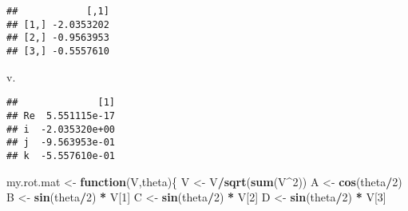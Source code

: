 \documentclass[]{article}
\newenvironment{Shaded}{\begin{snugshade}}{\end{snugshade}}
\newcommand{\KeywordTok}[1]{\textcolor[rgb]{0.13,0.29,0.53}{\textbf{#1}}}
\newcommand{\DecValTok}[1]{\textcolor[rgb]{0.00,0.00,0.81}{#1}}
\newcommand{\StringTok}[1]{\textcolor[rgb]{0.31,0.60,0.02}{#1}}
\newcommand{\ControlFlowTok}[1]{\textcolor[rgb]{0.13,0.29,0.53}{\textbf{#1}}}
\newcommand{\OperatorTok}[1]{\textcolor[rgb]{0.81,0.36,0.00}{\textbf{#1}}}
\newcommand{\NormalTok}[1]{#1}
\begin{document}
\begin{verbatim}
##            [,1]
## [1,] -2.0353202
## [2,] -0.9563953
## [3,] -0.5557610
\end{verbatim}

\begin{Shaded}
\begin{Highlighting}[]
\NormalTok{v.}
\end{Highlighting}
\end{Shaded}

\begin{verbatim}
##              [1]
## Re  5.551115e-17
## i  -2.035320e+00
## j  -9.563953e-01
## k  -5.557610e-01
\end{verbatim}

\begin{Shaded}
\begin{Highlighting}[]
\NormalTok{my.rot.mat <-}\StringTok{ }\ControlFlowTok{function}\NormalTok{(V,theta)\{}
\NormalTok{  V <-}\StringTok{ }\NormalTok{V}\OperatorTok{/}\KeywordTok{sqrt}\NormalTok{(}\KeywordTok{sum}\NormalTok{(V}\OperatorTok{^}\DecValTok{2}\NormalTok{))}
\NormalTok{  A <-}\StringTok{ }\KeywordTok{cos}\NormalTok{(theta}\OperatorTok{/}\DecValTok{2}\NormalTok{) }
\NormalTok{  B <-}\StringTok{ }\KeywordTok{sin}\NormalTok{(theta}\OperatorTok{/}\DecValTok{2}\NormalTok{) }\OperatorTok{*}\StringTok{ }\NormalTok{V[}\DecValTok{1}\NormalTok{]}
\NormalTok{  C <-}\StringTok{ }\KeywordTok{sin}\NormalTok{(theta}\OperatorTok{/}\DecValTok{2}\NormalTok{) }\OperatorTok{*}\StringTok{ }\NormalTok{V[}\DecValTok{2}\NormalTok{]}
\NormalTok{  D <-}\StringTok{ }\KeywordTok{sin}\NormalTok{(theta}\OperatorTok{/}\DecValTok{2}\NormalTok{) }\OperatorTok{*}\StringTok{ }\NormalTok{V[}\DecValTok{3}\NormalTok{]}

\end{Highlighting}
\end{Shaded}
\end{document}
